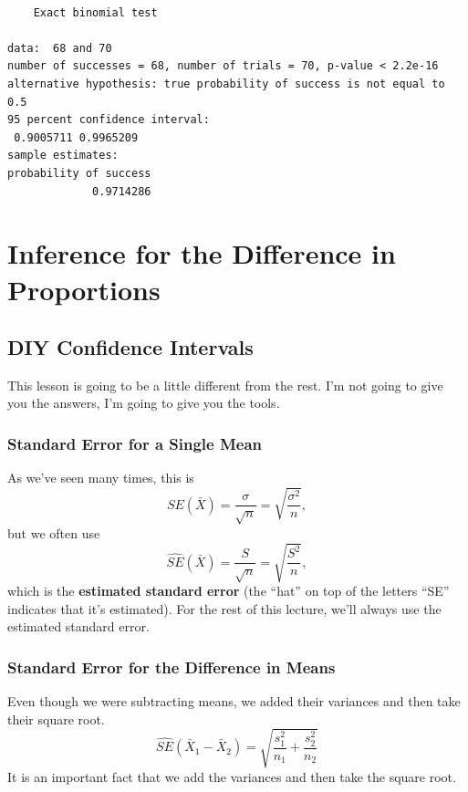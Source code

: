 \documentclass[
  letterpaper,
  DIV=11,
  numbers=noendperiod,
  oneside]{scrreprt}
\begin{document}
\begin{verbatim}

    Exact binomial test

data:  68 and 70
number of successes = 68, number of trials = 70, p-value < 2.2e-16
alternative hypothesis: true probability of success is not equal to 0.5
95 percent confidence interval:
 0.9005711 0.9965209
sample estimates:
probability of success 
             0.9714286 
\end{verbatim}

\hypertarget{inference-for-the-difference-in-proportions}{%
\chapter{Inference for the Difference in
Proportions}\label{inference-for-the-difference-in-proportions}}

\hypertarget{diy-confidence-intervals}{%
\section{DIY Confidence Intervals}\label{diy-confidence-intervals}}

This lesson is going to be a little different from the rest. I'm not
going to give you the answers, I'm going to give you the tools.

\hypertarget{standard-error-for-a-single-mean}{%
\subsection{Standard Error for a Single
Mean}\label{standard-error-for-a-single-mean}}

As we've seen many times, this is \[
SE(\bar X) = \frac{\sigma}{\sqrt{n}} = \sqrt{\frac{\sigma^2}{n}},
\] but we often use \[
\hat{SE}(\bar X) = \frac{S}{\sqrt{n}} = \sqrt{\frac{S^2}{n}},
\] which is the \textbf{estimated standard error} (the ``hat'' on top of
the letters ``SE'' indicates that it's estimated). For the rest of this
lecture, we'll always use the estimated standard error.

\hypertarget{standard-error-for-the-difference-in-means}{%
\subsection{Standard Error for the Difference in
Means}\label{standard-error-for-the-difference-in-means}}

Even though we were subtracting means, we added their variances and then
take their square root. \[
\hat{SE}(\bar X_1 - \bar X_2) = \sqrt{\frac{s_1^2}{n_1} + \frac{s_2^2}{n_2}}
\] It is an important fact that we add the variances and then take the
square root.
\end{document}
